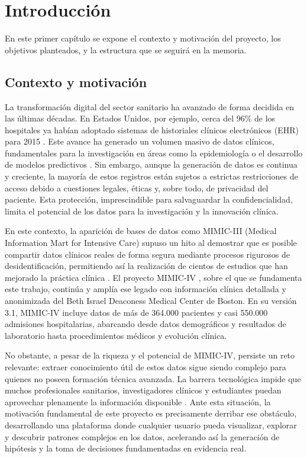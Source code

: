 \chapter{Introducción}

En este primer capítulo se expone el contexto y motivación del proyecto, los objetivos planteados, y la estructura que se seguirá en la memoria.

\section{Contexto y motivación}

La transformación digital del sector sanitario ha avanzado de forma decidida en las últimas décadas. En Estados Unidos, por ejemplo, cerca del 96\% de los hospitales ya habían adoptado sistemas de historiales clínicos electrónicos (EHR) para 2015 \cite{Henry2016_EHR}. Este avance ha generado un volumen masivo de datos clínicos, fundamentales para la investigación en áreas como la epidemiología o el desarrollo de modelos predictivos \cite{Halevy2009_data}. Sin embargo, aunque la generación de datos es continua y creciente, la mayoría de estos registros están sujetos a estrictas restricciones de acceso debido a cuestiones legales, éticas y, sobre todo, de privacidad del paciente. Esta protección, imprescindible para salvaguardar la confidencialidad, limita el potencial de los datos para la investigación y la innovación clínica.

En este contexto, la aparición de bases de datos como MIMIC-III \cite{MIMICIII_paper} (Medical Information Mart for Intensive Care) supuso un hito al demostrar que es posible compartir datos clínicos reales de forma segura mediante procesos rigurosos de desidentificación, permitiendo así la realización de cientos de estudios que han mejorado la práctica clínica \cite{Kallout2025_contribution}. El proyecto MIMIC-IV \cite{MIMICIV_paper, MIMICIV_dataset}, sobre el que se fundamenta este trabajo, continúa y amplía ese legado con información clínica detallada y anonimizada del Beth Israel Deaconess Medical Center de Boston. En su versión 3.1, MIMIC-IV incluye datos de más de 364.000 pacientes y casi 550.000 admisiones hospitalarias, abarcando desde datos demográficos y resultados de laboratorio hasta procedimientos médicos y evolución clínica.

\newpage
No obstante, a pesar de la riqueza y el potencial de MIMIC-IV, persiste un reto relevante: extraer conocimiento útil de estos datos sigue siendo complejo para quienes no poseen formación técnica avanzada. La barrera tecnológica impide que muchos profesionales sanitarios, investigadores clínicos y estudiantes puedan aprovechar plenamente la información disponible \cite{Khaled2025,AlAttrach2025,Gupta2022}. Ante esta situación, la motivación fundamental de este proyecto es precisamente derribar ese obstáculo, desarrollando una plataforma donde cualquier usuario pueda visualizar, explorar y descubrir patrones complejos en los datos, acelerando así la generación de hipótesis y la toma de decisiones fundamentadas en evidencia real.


